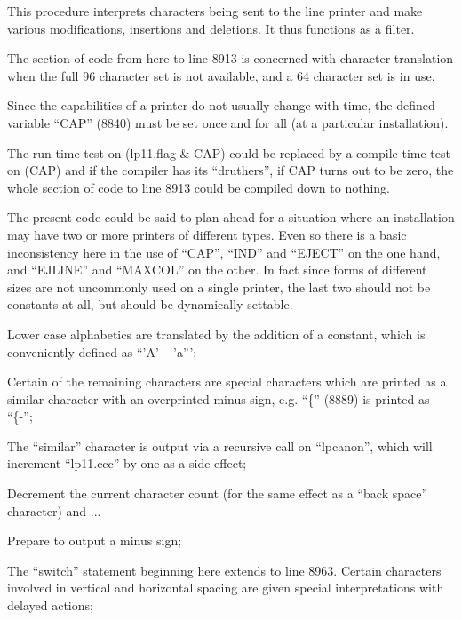 This procedure interprets characters
being sent to the line printer and make
various modifications, insertions and
deletions. It thus functions as a
filter.

\bd
\item[8884:] The section of code from here to
line 8913 is concerned with character translation when the full
96 character set is not available, and a 64 character set is
in use.

Since the capabilities of a
printer do not usually change
with time, the defined variable
``CAP'' (8840) must be set once and
for all (at a particular installation).

The run-time test on (lp11.flag \& CAP)
could be replaced by a compile-time test on
(CAP) and if the compiler has its
``druthers'', if CAP turns out to
be zero, the whole section of
code to line 8913 could be compiled down to nothing.

The present code could be said
to plan ahead for a situation
where an installation may have
two or more printers of different
types. Even so there is a basic
inconsistency here in the use of
``CAP'', ``IND'' and ``EJECT'' on the
one hand, and ``EJLINE'' and ``MAXCOL'' on the other. In fact since
forms of different sizes are not
uncommonly used on a single
printer, the last two should not
be constants at all, but should
be dynamically settable.

\item[8885:] Lower case alphabetics are
translated by the addition of a
constant, which is conveniently
defined as ``'A' -- 'a''';

\item[8887:] Certain of the remaining characters are special characters which
are printed as a similar character with an overprinted minus
sign, e.g. ``\{'' (8889) is printed as ``\{-'';

\item[8909:] The ``similar'' character is output
via a recursive call on
``lpcanon'', which will increment
``lp11.ccc'' by one as a side
effect;

\item[8910:] Decrement the current character
count (for the same effect as a
``back space'' character) and ...

\item[8911:] Prepare to output a minus sign;

\item[8915:] The ``switch'' statement beginning here
extends to line 8963. Certain characters involved in vertical
and horizontal spacing are given special interpretations
with delayed actions;

